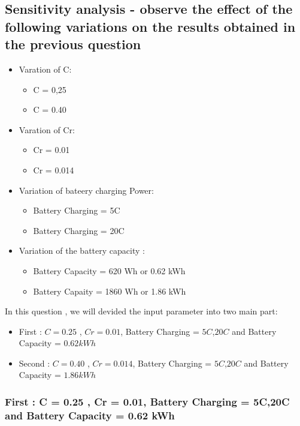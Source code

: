 \documentclass[12pt,a4paper]{article}
\numberwithin{equation}{section}
\begin{document}
\subsection{Sensitivity analysis - observe the effect of the following variations on the results obtained in the previous question}
\begin{itemize}
	\item Varation of C:
	\begin{itemize}
		\item C = 0,25
		\item C = 0.40
	\end{itemize}

	\item Varation of Cr:
	\begin{itemize}
		\item Cr = 0.01
		\item Cr = 0.014
	\end{itemize}

	\item Variation of bateery charging Power:
	\begin{itemize}
		\item Battery Charging = 5C
		\item Battery Charging = 20C
	\end{itemize}

	\item Variation of the battery capacity :
	
	\begin{itemize}
		\item Battery Capacity  = 620 Wh or 0.62 kWh
		\item Battery Capaity = 1860 Wh or 1.86 kWh
	\end{itemize}
\end{itemize}


In this question , we will devided the input parameter into two main part: 

\begin{itemize}
	\item First : $C = 0.25$ , $Cr = 0.01$, Battery Charging = $5C$,$20C$ and Battery Capacity = $0.62 kWh$
	\item Second : $C = 0.40$ , $Cr = 0.014$, Battery Charging = $5C$,$20C$ and Battery Capacity = $1.86 kWh$
\end{itemize}


\subsubsection{First : C = 0.25 , Cr = 0.01, Battery Charging = 5C,20C and Battery Capacity = 0.62 kWh}
\end{document}
